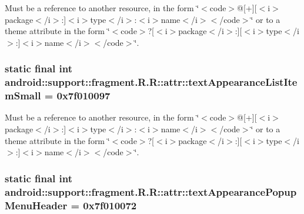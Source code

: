 Must be a reference to another resource, in the form \char`\"{}$<$code$>$@\mbox{[}+\mbox{]}\mbox{[}$<$i$>$package$<$/i$>$:\mbox{]}$<$i$>$type$<$/i$>$:$<$i$>$name$<$/i$>$$<$/code$>$\char`\"{} or to a theme attribute in the form \char`\"{}$<$code$>$?\mbox{[}$<$i$>$package$<$/i$>$:\mbox{]}\mbox{[}$<$i$>$type$<$/i$>$:\mbox{]}$<$i$>$name$<$/i$>$$<$/code$>$\char`\"{}. \hypertarget{classandroid_1_1support_1_1fragment_1_1_r_1_1attr_da86f6ce1511a5ec477bc092c7e64659}{
\subsubsection[{textAppearanceListItemSmall}]{\setlength{\rightskip}{0pt plus 5cm}static final int android::support::fragment.R.R::attr::textAppearanceListItemSmall = 0x7f010097}}
\label{classandroid_1_1support_1_1fragment_1_1_r_1_1attr_da86f6ce1511a5ec477bc092c7e64659}


Must be a reference to another resource, in the form \char`\"{}$<$code$>$@\mbox{[}+\mbox{]}\mbox{[}$<$i$>$package$<$/i$>$:\mbox{]}$<$i$>$type$<$/i$>$:$<$i$>$name$<$/i$>$$<$/code$>$\char`\"{} or to a theme attribute in the form \char`\"{}$<$code$>$?\mbox{[}$<$i$>$package$<$/i$>$:\mbox{]}\mbox{[}$<$i$>$type$<$/i$>$:\mbox{]}$<$i$>$name$<$/i$>$$<$/code$>$\char`\"{}. \hypertarget{classandroid_1_1support_1_1fragment_1_1_r_1_1attr_8f90f6337a0059e8ce5af548d7094798}{
\subsubsection[{textAppearancePopupMenuHeader}]{\setlength{\rightskip}{0pt plus 5cm}static final int android::support::fragment.R.R::attr::textAppearancePopupMenuHeader = 0x7f010072}}
\label{classandroid_1_1support_1_1fragment_1_1_r_1_1attr_8f90f6337a0059e8ce5af548d7094798}


